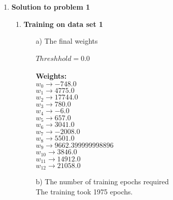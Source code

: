 
\usepackage{algorithm}
\usepackage{listings}
\usepackage{graphicx,amssymb,amsmath}
\usepackage{epstopdf}
\sloppy


\oddsidemargin 0in
\evensidemargin 0in
\textwidth 6.5in
\topmargin -0.5in
\textheight 9.0in




\pagestyle{myheadings}  %

\begin{enumerate}

	\item {\bf Solution to problem 1}
	
		\begin{enumerate}
			\item{\bf Training on data set 1}
				\begin{enumerate}
					\item[a)] The final weights \\ \\
						\(Threshhold = 0.0\) \\ \\
						\bf Weights: \\
						\(w_0 \rightarrow -748.0\) \\
						\(w_1 \rightarrow 4775.0\) \\
						\(w_2 \rightarrow 17744.0\) \\
						\(w_3 \rightarrow 780.0\) \\
						\(w_4 \rightarrow -6.0\) \\
						\(w_5 \rightarrow 657.0\) \\
						\(w_6 \rightarrow 3041.0\) \\
						\(w_7 \rightarrow -2008.0\) \\
						\(w_8 \rightarrow 5501.0\) \\
						\(w_9 \rightarrow 9662.399999998896\) \\
						\(w_{10} \rightarrow 3846.0\) \\
						\(w_{11} \rightarrow 14912.0\) \\
						\(w_{12} \rightarrow 21058.0\) \\
						
					\item[b)] The number of training epochs required \\
						\textnormal{The training took 1975 epochs.} \\
					

\end{enumerate}
\end{enumerate}
\end{enumerate}

